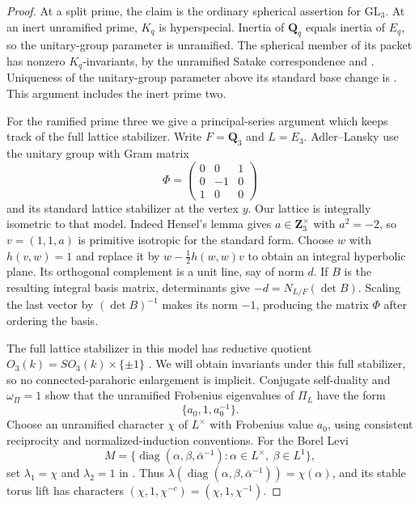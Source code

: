 \begin{proof}
At a split prime, the claim is the ordinary spherical assertion for
$\mathrm{GL}_3$. At an inert unramified prime, $K_q$ is hyperspecial.
Inertia of $\mathbf Q_q$ equals inertia of $E_q$, so the unitary-group
parameter is unramified. The spherical member of its packet has nonzero
$K_q$-invariants, by the unramified Satake correspondence and
\cite[Proposition~1.5.2(5), p.~79]{K17KMSW2014}.
Uniqueness of the unitary-group parameter above its standard base change
is \cite[Lemma~1.2.5]{K17KMSW2014}. This argument includes the inert
prime two.

For the ramified prime three we give a principal-series argument which
keeps track of the full lattice stabilizer. Write $F=\mathbf Q_3$ and
$L=E_3$. Adler--Lansky \cite[\S4.1, pp.~10--11]{K17AdlerLansky2010}
use the unitary group with Gram matrix
\[
 \Phi=\begin{pmatrix}0&0&1\\0&-1&0\\1&0&0\end{pmatrix}
\]
and its standard lattice stabilizer at the vertex $y$. Our lattice is
integrally isometric to that model. Indeed Hensel's lemma gives
$a\in\mathbf Z_3^\times$ with $a^2=-2$, so $v=(1,1,a)$ is primitive
isotropic for the standard form. Choose $w$ with $h(v,w)=1$ and replace it
by $w-\tfrac12h(w,w)v$ to obtain an integral hyperbolic plane. Its
orthogonal complement is a unit line, say of norm $d$. If $B$ is the
resulting integral basis matrix, determinants give
$-d=N_{L/F}(\det B)$. Scaling the last vector by $(\det B)^{-1}$ makes
its norm $-1$, producing the matrix $\Phi$ after ordering the basis.

The full lattice stabilizer in this model has reductive quotient
$O_3(k)=SO_3(k)\times\{\pm1\}$
\cite[\S4.2.1, pp.~11--12]{K17AdlerLansky2010}. We will obtain invariants
under this full stabilizer, so no connected-parahoric enlargement is
implicit. Conjugate self-duality and $\omega_\Pi=1$ show that the
unramified Frobenius eigenvalues of $\Pi_L$ have the form
\[
 \{a_0,1,a_0^{-1}\}.
\]
Choose an unramified character $\chi$ of $L^\times$ with Frobenius value
$a_0$, using consistent reciprocity and normalized-induction conventions.
For the Borel Levi
\[
 M=\{\operatorname{diag}(\alpha,\beta,\bar\alpha^{-1}):
       \alpha\in L^\times,\ \beta\in L^1\},
\]
set $\lambda_1=\chi$ and $\lambda_2=1$ in
\cite[(4.4.1), p.~14]{K17AdlerLansky2010}. Thus
$\lambda(\operatorname{diag}(\alpha,\beta,\bar\alpha^{-1}))=
\chi(\alpha)$, and its stable torus lift has characters
$(\chi,1,\chi^{-c})=(\chi,1,\chi^{-1})$.


\end{proof}
